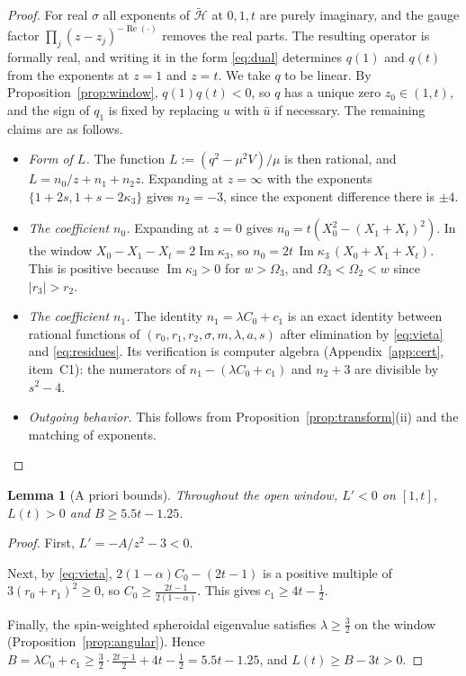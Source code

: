 \documentclass[11pt]{amsart}
\newtheorem{lemma}[theorem]{Lemma}
\theoremstyle{definition}
\theoremstyle{remark}
\numberwithin{equation}{section}
\renewcommand{\Im}{\operatorname{Im}}
\renewcommand{\Re}{\operatorname{Re}}
\begin{document}
\begin{proof}
For real $\sigma$ all exponents of $\widetilde{\mathcal H}$ at $0,1,t$ are purely imaginary, and the gauge factor $\prod_j(z-z_j)^{-\Re(\cdot)}$ removes the
real parts. The resulting operator is formally real, and writing it in the form \eqref{eq:dual} determines $q(1)$ and
$q(t)$ from the exponents at $z=1$ and $z=t$. We take $q$ to be linear. By Proposition~\ref{prop:window},
$q(1)q(t)<0$, so $q$ has a unique zero $z_0\in(1,t)$, and the sign of $q_1$ is fixed by replacing $u$ with $\bar u$
if necessary. The remaining claims are as follows.
\begin{itemize}
\item \emph{Form of $L$.} The function $L:=(q^2-\mu^2V)/\mu$ is then rational, and $L=n_0/z+n_1+n_2z$. Expanding at
$z=\infty$ with the exponents $\{1+2s,1+s-2\kappa_3\}$ gives $n_2=-3$, since the exponent difference there is $\pm4$.
\item \emph{The coefficient $n_0$.} Expanding at $z=0$ gives $n_0=t(X_0^2-(X_1+X_t)^2)$. In the window
$X_0-X_1-X_t=2\Im\kappa_3$, so $n_0=2t\,\Im\kappa_3\,(X_0+X_1+X_t)$. This is positive because $\Im\kappa_3>0$ for
$w>\Omega_3$, and $\Omega_3<\Omega_2<w$ since $|r_3|>r_2$.
\item \emph{The coefficient $n_1$.} The identity $n_1=\lambda C_0+c_1$ is an exact identity between rational
functions of $(r_0,r_1,r_2,\sigma,m,\lambda,a,s)$ after elimination by \eqref{eq:vieta} and \eqref{eq:residues}.
Its verification is computer algebra (Appendix~\ref{app:cert}, item~C1): the numerators of $n_1-(\lambda C_0+c_1)$
and $n_2+3$ are divisible by $s^2-4$.
\item \emph{Outgoing behavior.} This follows from Proposition~\ref{prop:transform}(ii) and the matching of exponents.
\qedhere
\end{itemize}
\end{proof}

\begin{lemma}[A priori bounds]\label{lem:floor}
Throughout the open window, $L'<0$ on $[1,t]$, $L(t)>0$ and $B\ge5.5t-1.25$.
\end{lemma}
\begin{proof}
First, $L'=-A/z^2-3<0$.

Next, by \eqref{eq:vieta}, $2(1-\alpha)C_0-(2t-1)$ is a positive multiple of $3(r_0+r_1)^2\ge0$, so
$C_0\ge\frac{2t-1}{2(1-\alpha)}$. This gives $c_1\ge4t-\frac12$.

Finally, the spin-weighted spheroidal eigenvalue satisfies $\lambda\ge\frac32$ on the window
(Proposition~\ref{prop:angular}). Hence $B=\lambda C_0+c_1\ge\frac32\cdot\frac{2t-1}{2}+4t-\frac12=5.5t-1.25$, and
$L(t)\ge B-3t>0$.
\end{proof}
\end{document}
